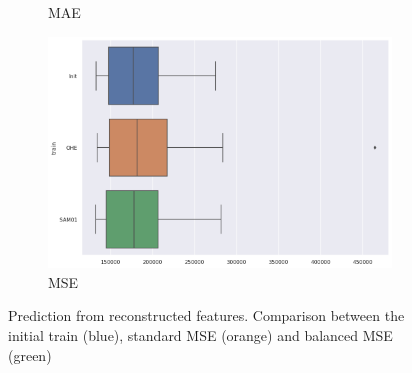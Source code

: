 \documentclass{article}
\theoremstyle{definition}
\begin{document}
\begin{figure}[H]
\begin{subfigure}[b]{0.49\textwidth}
         \caption{MAE}
         \quad
         \includegraphics[width=\textwidth]{imgs/PricingGame/boxplot_MSE.png}
         \caption{MSE}
     \end{subfigure}
     \caption{Prediction from reconstructed features. Comparison between the initial train (blue), standard MSE (orange) and balanced MSE (green)}
\end{figure}




\newpage
\end{document}

